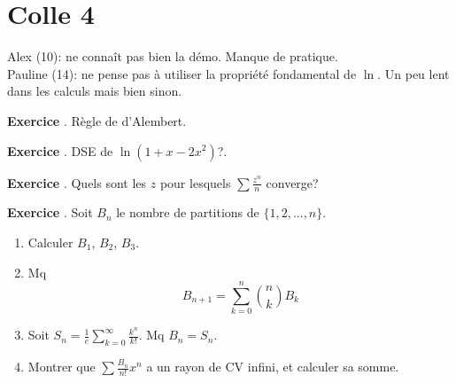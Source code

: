 \documentclass[10pt,a4paper]{article}
\newcounter{question}
\newcounter{exo}
\newenvironment{exo}{\vspace{0.5cm}\setcounter{question}{0}\addtocounter{exo}{1} \noindent \textbf{Exercice \theexo}. \normalsize }{\par}
\begin{document}
	\section*{Colle 4}
	\setcounter{exo}{0}
	Alex (10): ne connaît pas bien la démo. Manque de pratique.\\
	Pauline (14): ne pense pas à utiliser la propriété fondamental de $\ln$. Un peu lent dans les calculs mais bien sinon.\\

	\begin{exo}
		Règle de d'Alembert.
	\end{exo}
	
	\begin{exo}
		DSE de $\ln(1 + x -2x^2)$?.
	\end{exo}

	\begin{exo}
		Quels sont les $z$ pour lesquels $\sum \frac{z^n}{n}$ converge?
	\end{exo}

	\begin{exo}
		Soit $B_n$ le nombre de partitions de $\lbrace 1, 2, ..., n \rbrace$.
		\begin{enumerate}
			\item Calculer $B_1$, $B_2$, $B_3$.
			\item Mq $$B_{n+1} = \sum_{k=0}^{n} \binom{n}{k} B_k$$
			\item Soit $S_n = \frac{1}{e} \sum_{k=0}^{\infty} \frac{k^n}{k!}$. Mq $B_n = S_n$.
			\item Montrer que $\sum \frac{B_n}{n!} x^n$ a un rayon de CV infini, et calculer sa somme.
		\end{enumerate}
	\end{exo}
\end{document}
